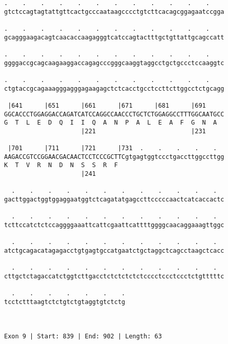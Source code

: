 \documentclass{article}
\begin{document}
\begin{Verbatim}
.    .    .    .    .    .    .    .    .    .    .    .    
gtctccagtagtattgttcactgcccaataagcccctgtcttcacagcggagaatccgga
                                                            
.    .    .    .    .    .    .    .    .    .    .    .    
gcagggaagacagtcaacaccaagagggtcatccagtactttgctgttattgcagccatt
                                                            
.    .    .    .    .    .    .    .    .    .    .    .    
ggggaccgcagcaagaaggaccagagcccgggcaaggtaggcctgctgccctccaaggtc
                                                            
.    .    .    .    .    .    .    .    .    .    .    .    
ctgtaccgcagaaagggagggagaagagctctcacctgcctccttcttggcctctgcagg
                                                            
 |641      |651      |661      |671      |681      |691     
GGCACCCTGGAGGACCAGATCATCCAGGCCAACCCTGCTCTGGAGGCCTTTGGCAATGCC
G  T  L  E  D  Q  I  I  Q  A  N  P  A  L  E  A  F  G  N  A  
                     |221                          |231     
  
 |701      |711      |721      |731  .    .    .    .    .  
AAGACCGTCCGGAACGACAACTCCTCCCGCTTCgtgagtggtccctgaccttggccttgg
K  T  V  R  N  D  N  S  S  R  F                             
                     |241                                   
  
  .    .    .    .    .    .    .    .    .    .    .    .  
gacttggactggtggaggaatggtctcagatatgagccttcccccaactcatcaccactc
                                                            
  .    .    .    .    .    .    .    .    .    .    .    .  
tcttccatctctccaggggaaattcattcgaattcattttggggcaacaggaaagttggc
                                                            
  .    .    .    .    .    .    .    .    .    .    .    .  
atctgcagacatagagacctgtgagtgccatgaatctgctaggctcagcctaagctcacc
                                                            
  .    .    .    .    .    .    .    .    .    .    .    .  
cttgctctagaccatctggtcttgacctctctctctctcccctccctccctctgtttttc
                                                            
  .    .    .    .    .    .    .
tcctctttaagtctctgtctgtaggtgtctctg
                                 
                                 
 
Exon 9 | Start: 839 | End: 902 | Length: 63




\end{Verbatim}
\end{document}
